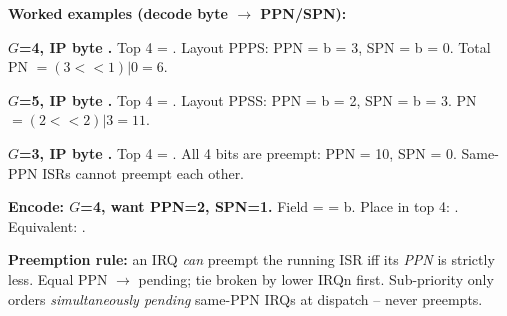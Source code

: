 \textbf{Worked examples (decode  byte $\to$ PPN/SPN):}

\begin{ex}\textbf{$G$=4, IP byte .} Top 4 = . Layout PPPS: PPN = b = 3, SPN = b = 0. Total PN $= (3{<<}1)|0 = 6$.\end{ex}

\begin{ex}\textbf{$G$=5, IP byte .} Top 4 = . Layout PPSS: PPN = b = 2, SPN = b = 3. PN $= (2{<<}2)|3 = 11$.\end{ex}

\begin{ex}\textbf{$G$=3, IP byte .} Top 4 = . All 4 bits are preempt: PPN = 10, SPN = 0. Same-PPN ISRs cannot preempt each other.\end{ex}

\begin{ex}\textbf{Encode: $G$=4, want PPN=2, SPN=1.} Field =  = b. Place in top 4: . Equivalent: .\end{ex}

\textbf{Preemption rule:} an IRQ \emph{can} preempt the running ISR iff its \emph{PPN} is strictly less. Equal PPN $\to$ pending; tie broken by lower IRQn first. Sub-priority only orders \emph{simultaneously pending} same-PPN IRQs at dispatch -- never preempts.

